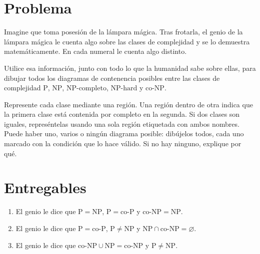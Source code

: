 \section{Problema}
Imagine que toma posesión de la lámpara mágica. Tras frotarla, el genio de la lámpara mágica le cuenta algo sobre las clases de complejidad y se lo demuestra matemáticamente. En cada numeral le cuenta algo distinto.

Utilice esa información, junto con todo lo que la humanidad sabe sobre ellas, para dibujar todos los diagramas de contenencia posibles entre las clases de complejidad \(\mathrm{P}\), \(\mathrm{NP}\), \(\mathrm{NP\text{-}completo}\), \(\mathrm{NP\text{-}hard}\) y \(\text{co-NP}\).

Represente cada clase mediante una región. Una región dentro de otra indica que la primera clase está contenida por completo en la segunda. Si dos clases son iguales, represéntelas usando una sola región etiquetada con ambos nombres. Puede haber uno, varios o ningún diagrama posible: dibújelos todos, cada uno marcado con la condición que lo hace válido. Si no hay ninguno, explique por qué.

\section{Entregables}

\begin{enumerate}
  \item El genio le dice que \(\mathrm{P} = \mathrm{NP}\), \(\mathrm{P} = \text{co-P}\) y \(\text{co-NP} = \mathrm{NP}\).
  \item El genio le dice que \(\mathrm{P} = \text{co-P}\), \(\mathrm{P} \neq \mathrm{NP}\) y \(\mathrm{NP} \cap \text{co-NP} = \varnothing\).
  \item El genio le dice que \(\text{co-NP} \cup \mathrm{NP} = \text{co-NP}\) y \(\mathrm{P} \neq \mathrm{NP}\).
\end{enumerate}
